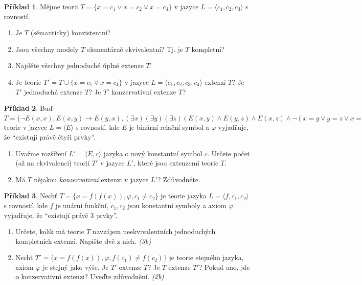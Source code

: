\documentclass[a4paper]{article}
\theoremstyle{definition}
\newtheorem{problem}{Příklad}
\begin{document}
\medskip\begin{problem}
    Mějme teorii $T=\{x=c_1 \vee x=c_2 \vee x=c_3\}$ v jazyce $L=\langle c_1,c_2,c_3\rangle$ s rovností.
    \begin{enumerate}[label=(\alph*),noitemsep,topsep=6pt]
        
        \item Je $T$ (sémanticky) konzistentní?
        \item Jsou všechny modely $T$ elementárně ekvivalentní? Tj. je $T$ kompletní?
        \item Najděte všechny jednoduché úplné extenze $T$.
        \item Je teorie $T'=T\cup\{x=c_1 \vee x=c_4\}$ v jazyce $L=\langle c_1,c_2,c_3,c_4\rangle$ extenzí $T$? Je $T'$ jednoduchá extenze $T$? Je $T'$ konzervativní extenze $T$?
    \end{enumerate}
\end{problem}


\medskip\begin{problem}
Buď $T=\{\neg E(x,x), E(x,y)\to E(y,x), (\exists x)(\exists y)(\exists z)(E(x,y)\wedge E(y,z)\wedge E(x,z)\wedge \neg(x=y\vee y=z\vee x=z)),\varphi\}$ teorie v jazyce $L=\langle E\rangle$ s rovností, kde $E$ je binární relační symbol a $\varphi$ vyjadřuje, že ``existují právě čtyři prvky''.
\begin{enumerate}[label=(\alph*),noitemsep,topsep=6pt]
    
    \item Uvažme rozšíření $L'=\langle E,c\rangle$ jazyka o nový konstantní symbol $c$. Určete počet (až na ekvivalenci) teorií $T'$ v jazyce $L'$, které jsou extenzemi teorie $T$. 
    \item Má $T$ nějakou \emph{konzervativní} extenzi v jazyce $L'$? Zdůvodněte.
\end{enumerate}
\end{problem}


\medskip\begin{problem}
Nechť $T=\{x=f(f(x)),\varphi, c_1 \ne c_2\}$ je teorie jazyka $L=\langle f,c_1,c_2\rangle$ s rovností, kde $f$ je unární funkční, $c_1,c_2$ jsou konstantní symboly a axiom $\varphi$ vyjadřuje, že ``existují právě $3$ prvky''.
\begin{enumerate}[label=(\alph*),noitemsep,topsep=6pt]
    
    \item Určete, kolik má teorie $T$ navzájem neekvivalentních jednoduchých kompletních extenzí. Napište dvě z nich. {\it (3b)}
    \item Nechť $T'=\{x=f(f(x)),\varphi,f(c_1)\ne f(c_2)\}$ je teorie stejného jazyka, axiom $\varphi$ je stejný jako výše. Je $T'$ extenze $T$? Je $T$ extenze $T'$? Pokud ano, jde o konzervativní extenzi? Uveďte zdůvodnění. {\it (2b)}
\end{enumerate}
\end{problem}
\end{document}
